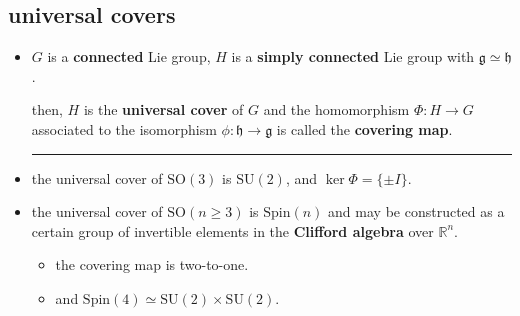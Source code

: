 \subsection{universal covers} \label{5.1.2}
\begin{itemize}
	\item $G$ is a \textbf{connected} Lie group, $H$ is a \textbf{simply connected} Lie group with $\mathfrak{g} \simeq \mathfrak{h}$.
	
	then, $H$ is the \textbf{universal cover} of $G$ and the homomorphism $\Phi : H \rightarrow G$ associated to the isomorphism $\phi : \mathfrak{h} \rightarrow \mathfrak{g}$ is called the \textbf{covering map}.
	
	\noindent\rule[0.5ex]{\linewidth}{0.5pt} %
	
	\item the universal cover of $\mathrm{SO}(3)$ is $\mathrm{SU}(2)$, and $\ker \Phi = \{\pm I\}$.
	
	\item the universal cover of $\mathrm{SO}(n \geq 3)$ is $\mathrm{Spin}(n)$ and may be constructed as a certain group of invertible elements in the \textbf{Clifford algebra} over $\mathbb{R}^n$.
	\begin{itemize}
		\item the covering map is two-to-one.
		
		\item and $\mathrm{Spin}(4) \simeq \mathrm{SU}(2) \times \mathrm{SU}(2)$.
	\end{itemize}
\end{itemize}

